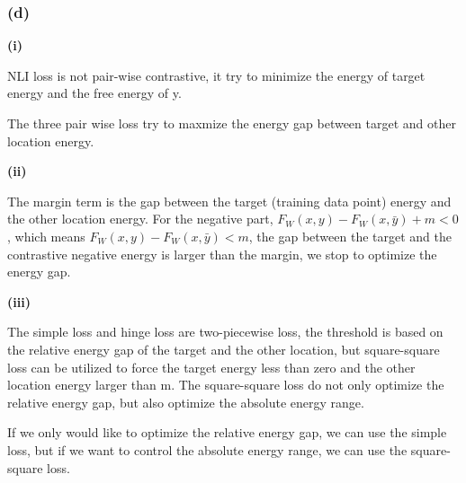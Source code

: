 \subsubsection*{(d)}
\textbf{(i)}

NLI loss is not pair-wise contrastive, it try to minimize the energy of target energy and the free energy of y.

The three pair wise loss try to maxmize the energy gap between target and other location energy.

\textbf{(ii)}

The margin term is the gap between the target (training data point) energy and the other location energy. For the negative part, $F_W(x, y) - F_W(x, \bar y) + m <0$, which means $F_W(x, y) - F_W(x, \bar y) <m$, the gap between the target and the contrastive negative energy is larger than the margin, we stop to optimize the energy gap.

\textbf{(iii)}

The simple loss and hinge loss are two-piecewise loss, the threshold is based on the relative energy gap of the target and the other location, but square-square loss can be utilized to force the target energy less than zero and the other location energy larger than m. The square-square loss do not only optimize the relative energy gap, but also optimize the absolute energy range.

If we only would like to optimize the relative energy gap, we can use the simple loss, but if we want to control the absolute energy range, we can use the square-square loss.
